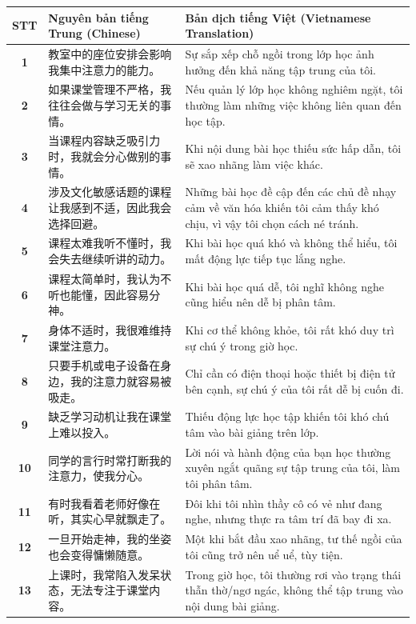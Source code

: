 \documentclass[11pt,a4paper]{article}
\begin{document}
\begin{longtable}{>{\bfseries}c p{6.5cm} p{8cm}}
\toprule
STT & Nguyên bản tiếng Trung (Chinese) & Bản dịch tiếng Việt (Vietnamese Translation) \\
\midrule
\endhead

1 & 教室中的座位安排会影响我集中注意力的能力。 & Sự sắp xếp chỗ ngồi trong lớp học ảnh hưởng đến khả năng tập trung của tôi. \\
\midrule
2 & 如果课堂管理不严格，我往往会做与学习无关的事情。 & Nếu quản lý lớp học không nghiêm ngặt, tôi thường làm những việc không liên quan đến học tập. \\
\midrule
3 & 当课程内容缺乏吸引力时，我就会分心做别的事情。 & Khi nội dung bài học thiếu sức hấp dẫn, tôi sẽ xao nhãng làm việc khác. \\
\midrule
4 & 涉及文化敏感话题的课程让我感到不适，因此我会选择回避。 & Những bài học đề cập đến các chủ đề nhạy cảm về văn hóa khiến tôi cảm thấy khó chịu, vì vậy tôi chọn cách né tránh. \\
\midrule
5 & 课程太难我听不懂时，我会失去继续听讲的动力。 & Khi bài học quá khó và không thể hiểu, tôi mất động lực tiếp tục lắng nghe. \\
\midrule
6 & 课程太简单时，我认为不听也能懂，因此容易分神。 & Khi bài học quá dễ, tôi nghĩ không nghe cũng hiểu nên dễ bị phân tâm. \\
\midrule
7 & 身体不适时，我很难维持课堂注意力。 & Khi cơ thể không khỏe, tôi rất khó duy trì sự chú ý trong giờ học. \\
\midrule
8 & 只要手机或电子设备在身边，我的注意力就容易被吸走。 & Chỉ cần có điện thoại hoặc thiết bị điện tử bên cạnh, sự chú ý của tôi rất dễ bị cuốn đi. \\
\midrule
9 & 缺乏学习动机让我在课堂上难以投入。 & Thiếu động lực học tập khiến tôi khó chú tâm vào bài giảng trên lớp. \\
\midrule
10 & 同学的言行时常打断我的注意力，使我分心。 & Lời nói và hành động của bạn học thường xuyên ngắt quãng sự tập trung của tôi, làm tôi phân tâm. \\
\midrule
11 & 有时我看着老师好像在听，其实心早就飘走了。 & Đôi khi tôi nhìn thầy cô có vẻ như đang nghe, nhưng thực ra tâm trí đã bay đi xa. \\
\midrule
12 & 一旦开始走神，我的坐姿也会变得慵懒随意。 & Một khi bắt đầu xao nhãng, tư thế ngồi của tôi cũng trở nên uể uể, tùy tiện. \\
\midrule
13 & 上课时，我常陷入发呆状态，无法专注于课堂内容。 & Trong giờ học, tôi thường rơi vào trạng thái thẫn thờ/ngơ ngác, không thể tập trung vào nội dung bài giảng. \\

\end{longtable}
\end{document}
